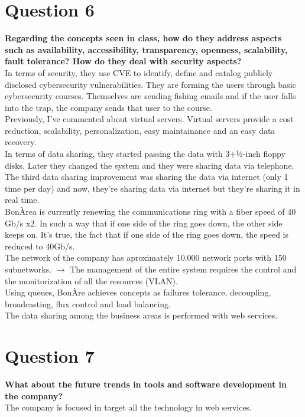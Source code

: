 \documentclass[12pt]{article}
\begin{document}
\section*{Question 6}
\textbf{Regarding the concepts seen in class, how do they address aspects such as availability, accessibility, transparency, openness, scalability, fault tolerance? How do they deal with security aspects?}\\
In terms of security, they use CVE to identify, define and catalog publicly disclosed cybersecurity vulnerabilities. They are forming the users through basic cybersecurity courses. Themselves are sending fishing emails and if the user falls into the trap, the company sends that user to the course.\\
Previously, I've commented about virtual servers. Virtual servers provide a cost reduction, scalability, personalization, easy maintainance and an easy data recovery.\\
In terms of data sharing, they started passing the data with 3+1⁄2-inch floppy disks. Later they changed the system and they were sharing data via telephone. The third data sharing improvement was sharing the data via internet (only 1 time per day) and now, they're sharing data via internet but they're sharing it in real time.\\
BonÀrea is currently renewing the communications ring with a fiber speed of 40 Gb/s x2. In such a way that if one side of the ring goes down, the other side keeps on. It's true, the fact that if one side of the ring goes down, the speed is reduced to 40Gb/s.\\
The network of the company has aproximately 10.000 network ports with 150 subnetworks. $\longrightarrow$ The management of the entire system requires the control and the monitorization of all the resources (VLAN).\\
Using queues, BonÀre achieves concepts as failures tolerance, decoupling, broadcasting, flux control and load balancing.\\
The data sharing among the business areas is performed with web services.
\section*{Question 7}
\textbf{What about the future trends in tools and software development in the company?}\\
The company is focused in target all the technology in web services.
\end{document}

